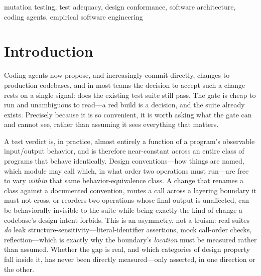 \documentclass[conference]{IEEEtran}
\begin{document}
\begin{IEEEkeywords}
mutation testing, test adequacy, design conformance, software architecture, coding agents, empirical software engineering
\end{IEEEkeywords}

\section{Introduction}\label{sec:intro}

Coding agents now propose, and increasingly commit directly, changes to production codebases, and in most teams the decision to accept such a change rests on a single signal: does the existing test suite still pass. The gate is cheap to run and unambiguous to read---a red build is a decision, and the suite already exists. Precisely because it is so convenient, it is worth asking what the gate can and cannot see, rather than assuming it sees everything that matters.

A test verdict is, in practice, almost entirely a function of a program's observable input/output behavior, and is therefore near-constant across an entire class of programs that behave identically. Design conventions---how things are named, which module may call which, in what order two operations must run---are free to vary \emph{within} that same behavior-equivalence class. A change that renames a class against a documented convention, routes a call across a layering boundary it must not cross, or reorders two operations whose final output is unaffected, can be behaviorally invisible to the suite while being exactly the kind of change a codebase's design intent forbids. This is an asymmetry, not a truism: real suites \emph{do} leak structure-sensitivity---literal-identifier assertions, mock call-order checks, reflection---which is exactly why the boundary's \emph{location} must be measured rather than assumed. Whether the gap is real, and which categories of design property fall inside it, has never been directly measured---only asserted, in one direction or the other.
\end{document}
